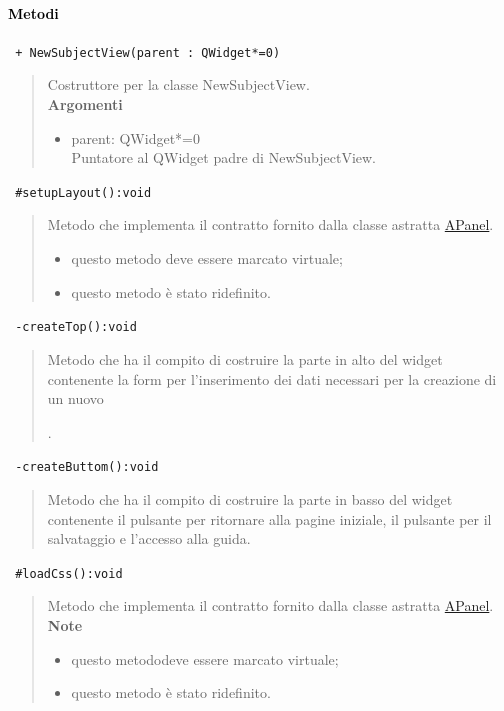 \paragraph{\textcolor{black}{Metodi\\}}
\color{blue}\verb! + NewSubjectView(parent : QWidget*=0)!
\begin{quote}
\color{black}Costruttore per la classe NewSubjectView. \\
\textbf{Argomenti}
\begin{itemize}
\item parent: QWidget*=0  \\ Puntatore al QWidget padre di NewSubjectView.
\end{itemize}
\end{quote}
\color{blue}\verb! #setupLayout():void!
\begin{quote}
\color{black} Metodo che implementa il contratto fornito dalla classe astratta \hyperref[speAPanel]{APanel}.\\
\begin{itemize}
\item questo metodo deve essere marcato virtuale;
\item questo metodo è stato ridefinito.
\end{itemize}
\end{quote} 
\color{blue}\verb! -createTop():void!
\begin{quote}
\color{black} Metodo che ha il compito di costruire la parte in alto del widget contenente la form per l'inserimento dei dati necessari per la creazione di un nuovo \subject{}.
\end{quote} 
\color{blue}\verb! -createButtom():void!
\begin{quote}
\color{black} Metodo che ha il compito di costruire la parte in basso del widget contenente il pulsante per ritornare alla pagine iniziale, il pulsante per il salvataggio e l'accesso alla guida.
\end{quote} 
\color{blue}\verb! #loadCss():void!
\begin{quote}
\color{black} Metodo che implementa il contratto fornito dalla classe astratta \hyperref[speAPanel]{APanel}.\\
 \textbf{Note}
 \begin{itemize}
  \item questo metododeve essere marcato virtuale;
 \item questo metodo è stato ridefinito.
 \end{itemize}
\end{quote} 
